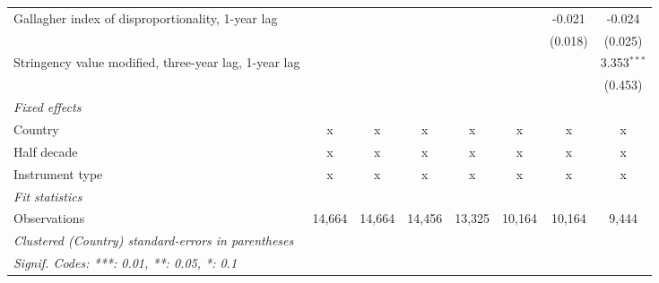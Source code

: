 \begin{table}[htbp]
\begin{tabular}{lccccccc}
      Gallagher index of disproportionality, 1-year lag     &         &         &         &             &              & -0.021       & -0.024\\   
                                                            &         &         &         &             &              & (0.018)      & (0.025)\\   
      Stringency value modified, three-year lag, 1-year lag &         &         &         &             &              &              & 3.353$^{***}$\\   
                                                            &         &         &         &             &              &              & (0.453)\\   
      \emph{Fixed effects}\\
      Country                                               & x       & x       & x       & x           & x            & x            & x\\  
      Half decade                                           & x       & x       & x       & x           & x            & x            & x\\  
      Instrument type                                       & x       & x       & x       & x           & x            & x            & x\\  
      \midrule \emph{Fit statistics}\\
      Observations                                          & 14,664  & 14,664  & 14,456  & 13,325      & 10,164       & 10,164       & 9,444\\  
      \midrule
      \multicolumn{8}{l}{\emph{Clustered (Country) standard-errors in parentheses}}\\
      \multicolumn{8}{l}{\emph{Signif. Codes: ***: 0.01, **: 0.05, *: 0.1}}\\
   \end{tabular}
\end{table}



